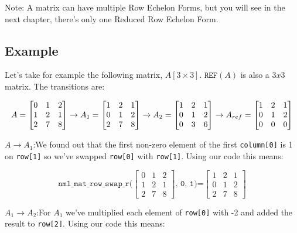 Note: A matrix can have multiple Row Echelon Forms, but you will see in the next chapter, there’s only one Reduced Row Echelon Form.

\subsection{Example}

Let’s take for example the following matrix, $A[3\times 3]$. $\texttt{REF}(A)$ is also a $3x3$ matrix. The transitions are:

$$
A=
\begin{bmatrix}
0 & 1 & 2 \\
1 & 2 & 1 \\
2 & 7 & 8
\end{bmatrix}
\rightarrow
A_{1}=
\begin{bmatrix}
1 & 2 & 1 \\
0 & 1 & 2 \\
2 & 7 & 8
\end{bmatrix}
\rightarrow
A_{2} =
\begin{bmatrix}
1 & 2 & 1 \\
0 & 1 & 2 \\
0 & 3 & 6
\end{bmatrix}
\rightarrow
\\
A_{ref}  =
\begin{bmatrix}
1 & 2 & 1 \\
0 & 1 & 2 \\
0 & 0 & 0
\end{bmatrix}
$$

$A \rightarrow A_1$:\quad We found out that the first non-zero element of the first {\tt column[0]} is 1 on {\tt row[1]} so we’ve swapped {\tt row[0]} with {\tt row[1]}. Using our code this means:

$$
\texttt{nml\_mat\_row\_swap\_r(}
\begin{bmatrix}
0 & 1 & 2 \\
1 & 2 & 1 \\
2 & 7 & 8
\end{bmatrix}
\texttt{, 0, 1)=}
\begin{bmatrix}
1 & 2 & 1 \\
0 & 1 & 2 \\
2 & 7 & 8
\end{bmatrix}
$$

$A_1 \rightarrow A_2$:\quad For $A_1$ we’ve multiplied each element of {\tt row[0]} with -2 and added the result to {\tt row[2]}. Using our code this means:

